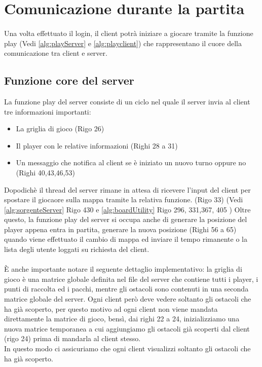 \documentclass[a4paper]{article}
\begin{document}
\section{Comunicazione durante la partita}
\paragraph{}
Una volta effettuato il login, il client potrà iniziare a giocare tramite la funzione play (Vedi \autoref{alg:playServer} e \autoref{alg:playclient})
che rappresentano il cuore della comunicazione tra client e server.
\subsection{Funzione core del server}
La funzione play del server consiste di un ciclo nel quale il server invia al client tre informazioni importanti:
\begin{itemize}
  \setlength\itemsep{0.2mm}
  \item La griglia di gioco (Rigo 26)
  \item Il player con le relative informazioni (Righi 28 a 31)
  \item Un messaggio che notifica al client se è iniziato un nuovo turno oppure no (Righi 40,43,46,53)
\end{itemize}
Dopodichè il thread del server rimane in attesa di ricevere l'input del client per spostare il giocaore sulla mappa tramite la relativa funzione. (Rigo 33) (Vedi \autoref{alg:sorgenteServer} Rigo 430 e \autoref{alg:boardUtility} Rigo 296, 331,367, 405 )
Oltre questo, la funzione play del server si occupa anche di generare la posizione del player appena entra in partita, generare la nuova posizione  (Righi 56 a 65) quando viene effettuato il cambio di mappa ed inviare il tempo rimanente o la lista degli utente loggati su richiesta del client. 

\paragraph{}
È anche importante notare il seguente dettaglio implementativo: la griglia di gioco
è una matrice globale definita nel file del server che contiene tutti i player,
i punti di raccolta ed i pacchi,  mentre gli ostacoli sono contenuti in una seconda matrice globale del server. 
Ogni client però deve vedere soltanto gli ostacoli che ha già scoperto, 
per questo motivo ad ogni client non viene mandata direttamente la matrice di gioco, bensì, dai righi 22 a 24, 
inizializziamo una nuova matrice temporanea 
a cui aggiungiamo gli ostacoli già scoperti dal client (rigo 24) prima di mandarla al client stesso.
\\In questo modo ci assicuriamo che ogni client visualizzi soltanto gli ostacoli che ha già scoperto.
\end{document}
